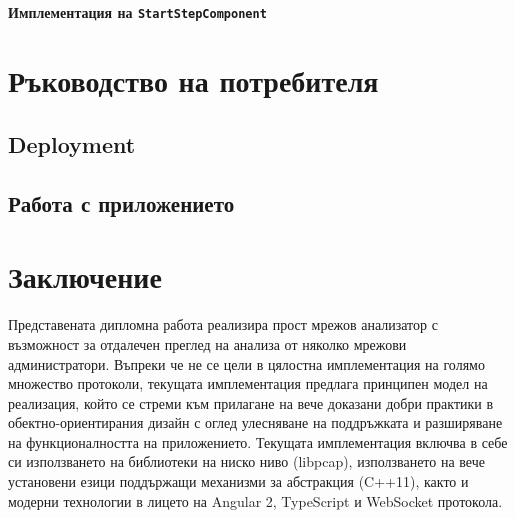 \documentclass[12pt,a4paper,oneside]{book}
\begin{document}
\subsubsection{Имплементация на \texttt{StartStepComponent}}

\chapter{Ръководство на потребителя}

\section{Deployment}

\section{Работа с приложението}

\chapter{Заключение}

Представената дипломна работа реализира прост мрежов анализатор с възможност за
отдалечен преглед на анализа от няколко мрежови администратори. Въпреки че не
се цели в цялостна имплементация на голямо множество протоколи, текущата
имплементация предлага принципен модел на реализация, който се стреми към
прилагане на вече доказани добри практики в обектно-ориентирания дизайн с оглед
улесняване на поддръжката и разширяване на функционалността на приложението.
Текущата имплементация включва в себе си използването на библиотеки на
ниско ниво (libpcap), използването на вече установени езици поддържащи механизми
за абстракция (C++11), както и модерни технологии в лицето на
Angular 2, TypeScript и WebSocket протокола.

%



\listoffigures
\listoftables

\printindex
\end{document}
